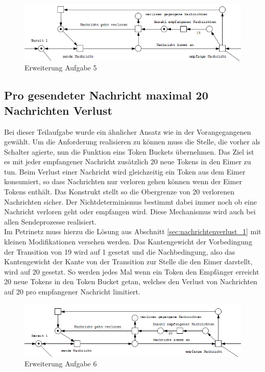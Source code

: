 \documentclass[10pt]{scrartcl}
\begin{document}
\begin{figure}[htbp]
	\centering	\includegraphics[width=1.0\textwidth]{Bilder/Erweiterung_Aufgabe_5}
	\caption{Erweiterung Aufgabe 5}
	\label{fig:Erweiterung5}
\end{figure}

\subsection{Pro gesendeter Nachricht maximal 20 Nachrichten Verlust}
Bei dieser Teilaufgabe wurde ein ähnlicher Ansatz wie in der Vorangegangenen gewählt.
Um die Anforderung realisieren zu können muss die Stelle, die vorher als Schalter agierte, nun die Funktion eins Token Buckets übernehmen.
Das Ziel ist es mit jeder empfangener Nachricht zusätzlich 20 neue Tokens in den Eimer zu tun.
Beim Verlust einer Nachricht wird gleichzeitig ein Token aus dem Eimer konsumiert, so dass Nachrichten nur verloren gehen können wenn der Eimer Tokens enthält.
Das Konstrukt stellt so die Obergrenze von 20 verlorenen Nachrichten sicher.
Der Nichtdeterminismus bestimmt dabei immer noch ob eine Nachricht verloren geht oder empfangen wird.
Diese Mechanismus wird auch bei allen Sendeprozesse realisiert.\\
Im Petrinetz muss hierzu die Lösung aus Abschnitt \ref{sec:nachrichtenverlust_1} mit kleinen Modifikationen versehen werden.
Das Kantengewicht der Vorbedingung der Transition von 19 wird auf 1 gesetzt und die Nachbedingung, also das Kantengewicht der Kante von der Transition zur Stelle die den Eimer darstellt, wird auf 20 gesetzt.
So werden jedes Mal wenn ein Token den Empfänger erreicht 20 neue Tokens in den Token Bucket getan, welches den Verlust von Nachrichten auf 20 pro empfangener Nachricht limitiert. 
 
\begin{figure}[htbp]
	\centering	\includegraphics[width=1.0\textwidth]{Bilder/Erweiterung_Aufgabe_6}
	\caption{Erweiterung Aufgabe 6}
	\label{fig:Erweiterung6}
\end{figure}
\end{document}
